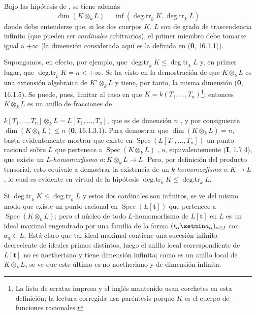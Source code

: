 \begin{remark}[4.2.1.4]
\label{IV.4.2.1.4}
Bajo las hipótesis de {}, se tiene
además
\begin{equation}
 \dim(K\otimes_kL)=
 \inf(\operatorname{deg.tr}_kK,\operatorname{deg.tr}_kL)
 \label{IV.4.2.1.5}\tag{4.2.1.5}
\end{equation}
donde debe entenderse que, si los dos cuerpos $K$, $L$ son de grado de
trascendencia infinito (que pueden ser \emph{cardinales} arbitrarios), el
primer miembro debe tomarse igual a $+\infty$ (la dimensión considerada
aquí es la definida en (\textbf{0}, 16.1.1)).

Supongamos, en efecto, por ejemplo, que
$\operatorname{deg.tr}_kK\leq\operatorname{deg.tr}_kL$ y, en primer
lugar, que $\operatorname{deg.tr}_kK=n<+\infty$. Se ha visto en la demostración
de {} que $K\otimes_kL$ es una
extensión algebraica de $K'\otimes_kL$ y tiene, por tanto, la misma dimensión
(\textbf{0}, 16.1.5). Se puede, pues, limitar al caso en que
$K=k(T_1,\ldots,T_n)$\footnote{La lista de erratas impresa y el inglés
mantenido usan corchetes en esta definición; la lectura corregida usa
paréntesis porque $K$ es el cuerpo de funciones racionales.}; entonces
$K\otimes_kL$ es un anillo de fracciones
de

$k[T_1,\ldots,T_n]\otimes_kL=L[T_1,\ldots,T_n]$,
que es de dimensión $n$ {}, y
por consiguiente $\dim(K\otimes_kL)\leq n$ (\textbf{0}, 16.1.3.1). Para demostrar que
$\dim(K\otimes_kL)=n$, basta evidentemente mostrar que existe en
$\operatorname{Spec}(L[T_1,\ldots,T_n])$ un punto racional sobre $L$
que pertenece a $\operatorname{Spec}(K\otimes_kL)$
{}, o, equivalentemente (\textbf I, 1.7.4), que
existe un $L$-\emph{homomorfismo} $u:K\otimes_kL\to L$. Pero, por definición
del producto tensorial, esto equivale a demostrar la existencia de un
$k$-\emph{homomorfismo} $v:K\to L$, lo cual es evidente en virtud de
la hipótesis
$\operatorname{deg.tr}_kK\leq\operatorname{deg.tr}_kL$.

Si $\operatorname{deg.tr}_kK\leq\operatorname{deg.tr}_kL$ y estos
dos cardinales son infinitos, se ve del mismo modo que existe un punto
racional en $\operatorname{Spec}(L[\mathbf{t}])$ que
pertenece a $\operatorname{Spec}(K\otimes_kL)$; pero el núcleo de todo
$L$-homomorfismo de $L[\mathbf{t}]$ en $L$ es un
ideal maximal engendrado por una familia de la forma
$(t_\alpha\setmin a_\alpha)_{\alpha\in I}$ con $a_\alpha\in L$. Está claro
que tal ideal maximal contiene una sucesión infinita decreciente
de ideales primos distintos, luego el anillo local correspondiente de
$L[\mathbf{t}]$ no es noetheriano y tiene
dimensión infinita; como es un anillo local de $K\otimes_kL$, se
ve que este último es no noetheriano y de dimensión infinita.
\end{remark}


